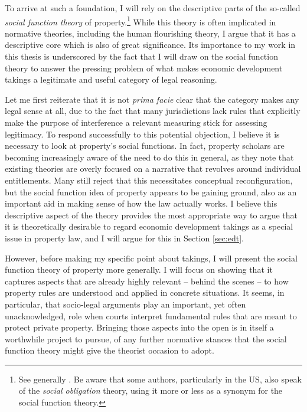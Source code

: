 To arrive at such a foundation, I will rely on the descriptive parts of the so-called {\it social function theory} of property.\footnote{See generally \cite{foster11,mirow10,alexander09a}. Be aware that some authors, particularly in the US, also speak of the {\it social obligation} theory, using it more or less as a synonym for the social function theory.} While this theory is often implicated in normative theories, including the human flourishing theory, I argue that it has a descriptive core which is also of great significance. Its importance to my work in this thesis is underscored by the fact that I will draw on the social function theory to answer the pressing problem of what makes economic development takings a legitimate and useful category of legal reasoning. 

Let me first reiterate that it is not {\it prima facie} clear that the category makes any legal sense at all, due to the fact that many jurisdictions lack rules that explicitly make the purpose of interference a relevant measuring stick for assessing legitimacy. To respond successfully to this potential objection, I believe it is necessary to look at property's social functions. In fact, property scholars are becoming increasingly aware of the need to do this in general, as they note that existing theories are overly focused on a narrative that revolves around individual entitlements. Many still reject that this necessitates conceptual reconfiguration, but the social function idea of property appears to be gaining ground, also as an important aid in making sense of how the law actually works. I believe this descriptive aspect of the theory provides the most appropriate way to argue that it is theoretically desirable to regard economic development takings as a special issue in property law, and I will argue for this in Section \ref{sec:edt}.

However, before making my specific point about takings, I will present the social function theory of property more generally. I will focus on showing that it captures aspects that are already highly relevant -- behind the scenes -- to how property rules are understood and applied in concrete situations. It seems, in particular, that socio-legal arguments play an important, yet often unacknowledged, role when courts interpret fundamental rules that are meant to protect private property. Bringing those aspects into the open is in itself a worthwhile project to pursue,  of any further normative stances that the social function theory might give the theorist occasion to adopt.

